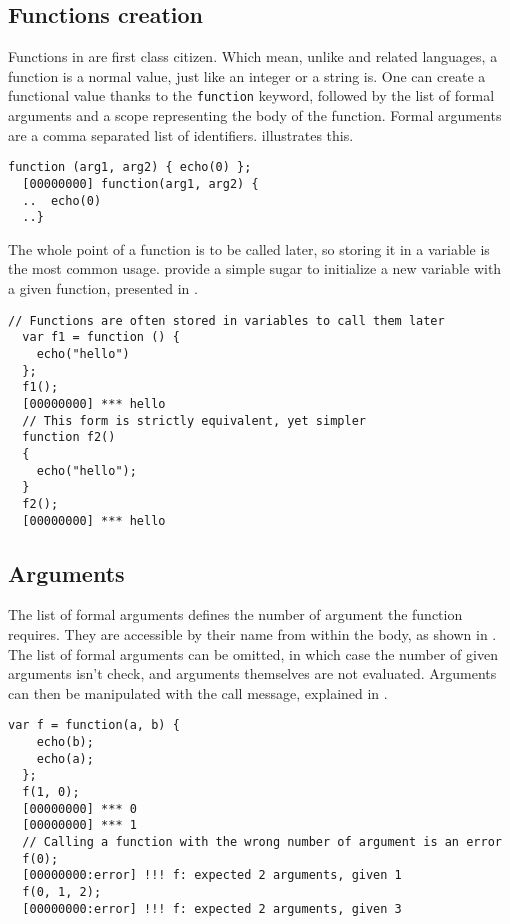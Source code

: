 \documentclass[openright,twoside,12pt]{report}
\begin{document}
\subsection{Functions creation}

Functions in \us are first class citizen. Which mean, unlike \C and
related languages, a function is a normal value, just like an integer
or a string is. One can create a functional value thanks to the
\lstinline|function| keyword, followed by the list of formal arguments
and a scope representing the body of the function. Formal arguments
are a comma separated list of identifiers.  illustrates
this.

\begin{lstlisting}[caption=Functional
  value,label=lst:function,float=\floatpos]
  function (arg1, arg2) { echo(0) };
  [00000000] function(arg1, arg2) {
  ..  echo(0)
  ..}
\end{lstlisting}

The whole point of a function is to be called later, so storing it in
a variable is the most common usage. \us provide a simple sugar to
initialize a new variable with a given function, presented in
.

\begin{lstlisting}[caption=Storing functions in variables,
  label=lst:function-sugar,float=\floatpos]
  // Functions are often stored in variables to call them later
  var f1 = function () {
    echo("hello")
  };
  f1();
  [00000000] *** hello
  // This form is strictly equivalent, yet simpler
  function f2()
  {
    echo("hello");
  }
  f2();
  [00000000] *** hello
\end{lstlisting}

\subsection{Arguments}

The list of formal arguments defines the number of argument the
function requires. They are accessible by their name from within the
body, as shown in . The list of formal arguments
can be omitted, in which case the number of given arguments isn't
check, and arguments themselves are not evaluated. Arguments can then
be manipulated with the call message, explained in
.

\begin{lstlisting}[caption=Storing and calling
  functions,label=lst:function-args,float=\floatpos]
  var f = function(a, b) {
    echo(b);
    echo(a);
  };
  f(1, 0);
  [00000000] *** 0
  [00000000] *** 1
  // Calling a function with the wrong number of argument is an error
  f(0);
  [00000000:error] !!! f: expected 2 arguments, given 1
  f(0, 1, 2);
  [00000000:error] !!! f: expected 2 arguments, given 3
\end{lstlisting}
\end{document}
